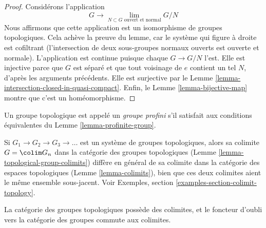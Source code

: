 \begin{proof}
\medskip\noindent
Considérons l'application
$$
G \longrightarrow \lim_{N \subset G\text{ ouvert et normal}} G/N
$$
Nous affirmons que cette application est un isomorphisme de groupes
topologiques. Cela achève la preuve du lemme, car le système qui figure à
droite est cofiltrant (l'intersection de deux sous-groupes normaux ouverts est
ouverte et normale). L'application est continue puisque chaque $G \to G/N$
l'est.
Elle est injective parce que $G$ est séparé et que tout voisinage de $e$
contient un tel $N$, d'après les arguments précédents. Elle est surjective par
le Lemme \ref{lemma-intersection-closed-in-quasi-compact}. Enfin, le
Lemme \ref{lemma-bijective-map} montre que c'est un homéomorphisme.
\end{proof}

\begin{definition}
\label{definition-profinite-group}
Un groupe topologique est appelé un {\it groupe profini} s'il satisfait aux
conditions équivalentes du Lemme \ref{lemma-profinite-group}.
\end{definition}

\noindent
Si $G_1 \to G_2 \to G_3 \to \ldots$ est un système de groupes topologiques,
alors sa colimite $G = \colim G_n$ dans la catégorie des groupes topologiques
(Lemme \ref{lemma-topological-group-colimits}) diffère en général de sa
colimite dans la catégorie des espaces topologiques
(Lemme \ref{lemma-colimits}), bien que ces deux colimites aient le même
ensemble sous-jacent. Voir Exemples,
section \ref{examples-section-colimit-topology}.

\begin{lemma}
\label{lemma-topological-group-colimits}
La catégorie des groupes topologiques possède des colimites, et le foncteur
d'oubli vers la catégorie des groupes commute aux colimites.
\end{lemma}

